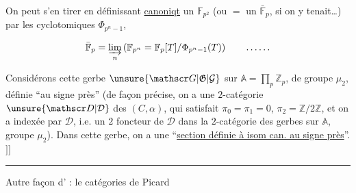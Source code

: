 On peut s'en tirer en définissant \uline{canoniqt} un
$\mathbb F_{p^2}$ (ou $=$ un $\bar{\mathbb F}_p$, si on y tenait\ldots) par les 
cyclotomiques $\Phi_{p^n-1}$,

\[
\bar{\mathbb F}_p=\varinjlim_n\left(\mathbb F_{p^n}=\mathbb F_p[T]/\Phi_{p^n-1}(T)\right)
\qquad \ldots\ldots
\]
\unsure{;}


Considérons cette gerbe $\unsure{\mathscr G|\mathfrak G|\mathcal G}$  sur $\mathbb A=\prod_p\mathbb Z_p$, de
groupe $\mu_2$, définie ``au signe près'' (de
façon précise, on a une $2$-catégorie $\unsure{\mathscr D|\mathcal D}$ des $(C,\alpha)$,
qui satisfait $\pi_0=\pi_1=0$, $\pi_2=\mathbb Z/2\mathbb Z$, et  on
a   indexée par $\mathscr D$, i.e. un $2$ foncteur
de $\mathscr D$ dans la $2$-catégorie des  gerbes sur $\mathbb A$,
groupe $\mu_2$). Dans cette gerbe, on a une
``\uline{section définie à isom can. au signe près}''. $]]$


\noindent\rule{2cm}{0.4pt}
Autre façon d' : le  
catégories de Picard 


